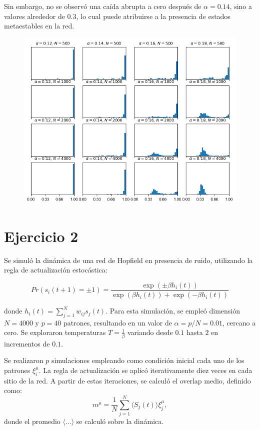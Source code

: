\documentclass[aps,prb,twocolumn,superscriptaddress,floatfix,longbibliography]{revtex4-2}
\begin{document}
Sin embargo, no se observó una caída abrupta a cero después de \( \alpha = 0.14 \), sino a valores alrededor de $0.3$, lo cual puede atribuirse a la presencia de estados metaestables en la red.


\begin{figure}[h]
  \includegraphics[clip=true,width=\columnwidth]{../ej1_histograma.png}
  \caption{}
   \label{fig:ej1_histograma}
\end{figure}

\section*{Ejercicio 2}

Se simuló la dinámica de una red de Hopfield en presencia de ruido, utilizando la regla de actualización estocástica:

\[ Pr(s_i(t + 1) = \pm1) = \frac{\exp(\pm\beta h_i(t))}{\exp(\beta h_i(t)) + \exp(-\beta h_i(t))} \]

donde \( h_i(t) = \sum_{j=1}^{N} w_{ij}s_j(t) \). Para esta simulación, se empleó dimensión \( N = 4000 \) y \( p = 40 \) patrones, resultando en un valor de \( \alpha = p/N = 0.01 \), cercano a cero. Se exploraron temperaturas \( T = \frac{1}{\beta} \) variando desde $0.1$ hasta $2$ en incrementos de $0.1$.

Se realizaron $p$ simulaciones empleando como condición inicial cada uno de los patrones \( \xi_i^\mu \). La regla de actualización se aplicó iterativamente diez veces en cada sitio de la red. A partir de estas iteraciones, se calculó el overlap medio, definido como:
\[ m^\mu = \frac{1}{N} \sum_{j=1}^{N} \langle S_j(t) \rangle \xi_j^\mu, \]
donde el promedio \( \langle \ldots \rangle \) se calculó sobre la dinámica.
\end{document}
